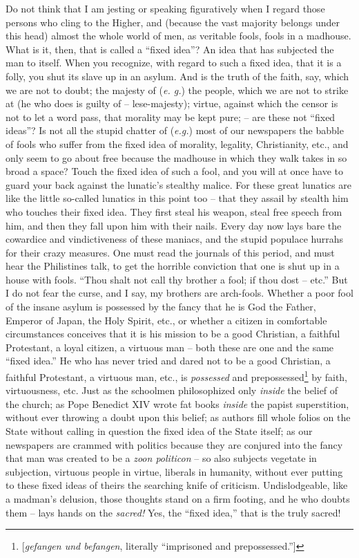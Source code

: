 \documentclass[12pt,a4paper]{book}
\begin{document}
Do not think that I am jesting or speaking figuratively when I regard those 
persons who cling to the Higher, and (because the vast majority belongs under 
this head) almost the whole world of men, as veritable fools, fools in a 
madhouse. What is it, then, that is called a ``fixed idea''? An idea that 
has subjected the man to itself. When you recognize, with regard to such a 
fixed idea, that it is a folly, you shut its slave up in an asylum. And is the 
truth of the faith, say, which we are not to doubt; the majesty of (\textit{e. 
g.}) the people, which we are not to strike at (he who does is guilty of -- 
lese-majesty); virtue, against which the censor is not to let a word pass, 
that morality may be kept pure; -- are these not ``fixed ideas''? Is not all 
the stupid chatter of (\textit{e.g.}) most of our newspapers the babble of 
fools who suffer from the fixed idea of morality, legality, Christianity, 
etc., and only seem to go about free because the madhouse in which they walk 
takes in so broad a space? Touch the fixed idea of such a fool, and you will 
at once have to guard your back against the lunatic's stealthy malice. For 
these great lunatics are like the little so-called lunatics in this point too 
-- that they assail by stealth him who touches their fixed idea. They first 
steal his weapon, steal free speech from him, and then they fall upon him with 
their nails. Every day now lays bare the cowardice and vindictiveness of these 
maniacs, and the stupid populace hurrahs for their crazy measures. One must 
read the journals of this period, and must hear the Philistines talk, to get 
the horrible conviction that one is shut up in a house with fools. ``Thou 
shalt not call thy brother a fool; if thou dost -- etc.'' But I do not fear 
the curse, and I say, my brothers are arch-fools. Whether a poor fool of the 
insane asylum is possessed by the fancy that he is God the Father, Emperor of 
Japan, the Holy Spirit, etc., or whether a citizen in comfortable 
circumstances conceives that it is his mission to be a good Christian, a 
faithful Protestant, a loyal citizen, a virtuous man -- both these are one and 
the same ``fixed idea.'' He who has never tried and dared not to be a good 
Christian, a faithful Protestant, a virtuous man, etc., is \textit{possessed} 
and prepossessed\footnote{[\textit{gefangen und befangen}, literally 
``imprisoned and prepossessed.'']} by faith, virtuousness, etc. Just as the 
schoolmen philosophized only \textit{inside} the belief of the church; as Pope 
Benedict XIV wrote fat books \textit{inside} the papist superstition, without 
ever throwing a doubt upon this belief; as authors fill whole folios on the 
State without calling in question the fixed idea of the State itself; as our 
newspapers are crammed with politics because they are conjured into the fancy 
that man was created to be a \textit{zoon politicon} -- so also subjects 
vegetate in subjection, virtuous people in virtue, liberals in humanity, 
without ever putting to these fixed ideas of theirs the searching knife of 
criticism. Undislodgeable, like a madman's delusion, those thoughts stand on a 
firm footing, and he who doubts them -- lays hands on the \textit{sacred!} 
Yes, the ``fixed idea,'' that is the truly sacred!
\end{document}

